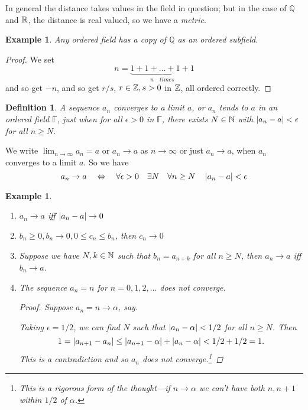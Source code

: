 \documentclass{notes}
\theoremstyle{plain}
\newtheorem{definition}[proposition]{Definition}
\newtheorem{example}[proposition]{Example}
\newcommand{\Q}{\mathbb{Q}}
\renewcommand{\F}{\mathbb{F}}
\newcommand{\Forall}[1]{\forall #1 \quad}
\newcommand{\Exists}[1]{\exists #1 \quad}
\begin{document}
In general the distance takes values in the field in question; but 
in the case of $ \Q $ and $ \mathbb{R} $, the distance is real valued, so 
we have a \emph{metric}.

\begin{example}
Any ordered field has a copy of $ \Q $ as an ordered subfield.
\end{example}
\begin{proof}
We set \[ n= \underbrace{1+1+\ldots+1+1}_{n \quad times} \] and so 
get $ -n $, and so get $ r/s $, $ r \in \mathbb{Z}, s>0 $  in $ \mathbb{Z} $, 
all ordered correctly.
\end{proof}

\begin{definition}
\label{d1.4}
A sequence $ a_{n} $ \emph{converges to a limit} $ a $, or $ a_{n} 
$ tends to $ a $ in an ordered field $ \F $, just when for 
all $ \epsilon > 0 $ in $ \F $, there exists $ N \in \mathbb{N} $ with
$\left|a_{n}-a\right| < \epsilon$ for all $n \geq N$.
\end{definition}

We write $ \lim_{n \to \infty}a_{n}=a $ or $ a_{n} 
\to a $ as $ n \to \infty $ or just $ a_{n} 
\to a $, when $ a_{n} $ converges to a limit $ a $. So we 
have
\[ a_{n}\to a \quad \Leftrightarrow
 \quad \Forall{\epsilon>0} \Exists{N}
\Forall{n \geq N} \abs{a_{n}-a}<\epsilon \]

\begin{example}
\

\begin{enumerate}
\item $ a_{n} \to a $ iff $ \left|a_{n}-a\right| \to 0 $
\item $ b_{n}\geq 0, b_{n} \to 0, 0 \leq c_{n} \leq b_{n} $, 
then $ c_{n} \to 0 $
\item Suppose we have $ N, k \in \mathbb{N} $ such that $ b_{n}= a_{n+k} 
$ for all $ n \geq N $, then $ a_{n} \to a $ iff $ b_{n} 
\to a $.
\item The sequence $ a_{n} =n $ for $ n= 0,1,2,\ldots $ does not 
converge.
\begin{proof}
Suppose $ a_{n}=n \to \alpha $, say. 

Taking $ \epsilon = 1/2 $, we can find $ N $ such that
$\left|a_{n}-\alpha\right| < 1/2$ for all $n\geq N$.
Then \[ 1 = \left|a_{n+1}-a_{n}\right| \leq \left|a_{n+1}-\alpha\right| + 
\left|a_{n}- \alpha\right| < 1/2 + 1/2 =1. 
\]
This is a contradiction and so $ a_{n} $ does not
converge.\footnote{This is a rigorous form of the thought---if $ n
\to \alpha $ 
we can't have both $ n, n+1 $ within $ 1/2 $ of $ \alpha $.}
\end{proof}
\end{enumerate}
\end{example}
\end{document}
